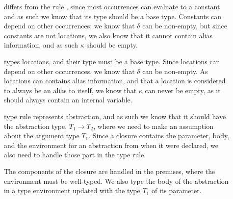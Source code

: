 \documentclass{eptcs}
\begin{document}
\begin{description}
\item[] differs from the rule , since
  most occurrences can evaluate to a constant and as such we know that
  its type should be a base type. Constants can depend on other
  occurrences; we know that $\delta$ can be non-empty, but since
  constants are not locations, we also know that it cannot contain
  alias information, and as such $\kappa$ should be empty.

\item[] types locations, and their type must be a base
  type. Since locations can depend on other occurrences, we know that
  $\delta$ can be non-empty.  As locations can contains alias
  information, and that a location is considered to always be an alias
  to itself, we know that $\kappa$ can never be empty, as it should
  always contain an internal variable.

	\item[] type rule represents abstraction, and as
          such we know that it should have the abstraction type,
          $T_1\rightarrow T_2$, where we need to make an assumption
          about the argument type $T_1$. 
		Since a closure contains the parameter, body, and the
                environment for an abstraction from when it were
                declared, we also need to handle those part in the
                type rule.
                
		The components of the closure are handled in the
                premises, where the environment must be well-typed.
                We also type the body of the abstraction in a type
                environment updated with the type $T_1$ of its
                parameter.


\end{description}
\end{document}
